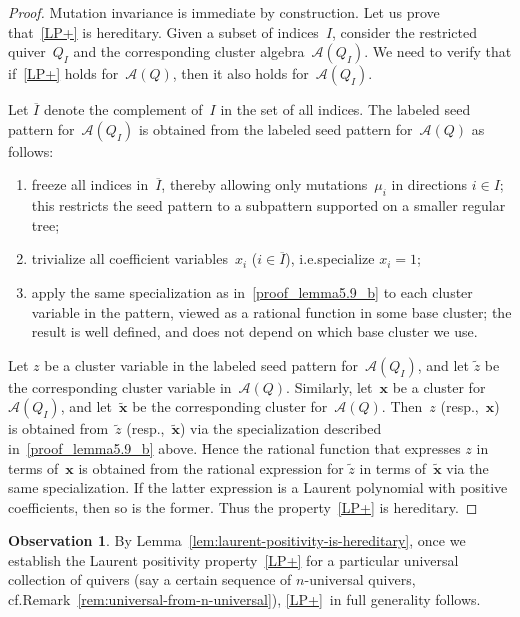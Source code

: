 \documentclass[10pt]{amsart}
\theoremstyle{definition}
\newtheorem{observation}[theorem]{Observation}
\newcommand{\cf}{cf.}
\newcommand{\ie}{i.e.}
\begin{document}
\begin{proof}
Mutation invariance is immediate by construction. Let us prove that~\ref{LP+} is hereditary. Given a subset of indices~$I$, consider the restricted quiver~$Q_I$ and the corresponding cluster algebra~$\mathcal{A}(Q_I)$. We need to verify that if~\ref{LP+} holds for~$\mathcal{A}(Q)$, then it also holds for~$\mathcal{A}(Q_I)$. 

Let $\overline I$ denote the complement of~$I$ in the set of all indices. The labeled seed pattern for~$\mathcal{A}(Q_I)$ is obtained from the labeled seed pattern for~$\mathcal{A}(Q)$ as follows: 
\begin{enumerate}[label=(\alph*)]
\item\label{proof_lemma5.9_a} %
freeze all indices in~$\overline I$, thereby allowing only mutations~$\mu_i$ in directions $i\in I$; this restricts the seed pattern to a subpattern supported on a smaller regular tree; 
\item\label{proof_lemma5.9_b} %
trivialize all coefficient variables~$x_i$ ($i\in\overline I$), \ie specialize $x_i=1$;
\item\label{proof_lemma5.9_c} %
apply the same specialization as in~\ref{proof_lemma5.9_b} to each cluster variable in the pattern, viewed as a rational function in some base cluster; the result is well defined, and does not depend on which base cluster we use. 
\end{enumerate}
Let $z$ be a cluster variable in the labeled seed pattern for~$\mathcal{A}(Q_I)$, and let $\tilde z$ be the corresponding cluster variable in~$\mathcal{A}(Q)$. Similarly, let~$\mathbf{x}$ be a cluster for~$\mathcal{A}(Q_I)$, and let~$\mathbf{\tilde x}$ be the corresponding cluster for~$\mathcal{A}(Q)$. 
Then~$z$ (resp.,~$\mathbf{x}$) is obtained from~$\tilde z$ (resp.,~$\mathbf{\tilde x}$) via the specialization described in~\ref{proof_lemma5.9_b} above. 
Hence the rational function that expresses $z$ in terms of~$\mathbf{x}$ is obtained from the rational expression for $\tilde z$ in terms of~$\mathbf{\tilde x}$ via the same specialization. If the latter expression is a Laurent polynomial with positive coefficients, then so is the former. Thus the property~\ref{LP+} is hereditary. 
\end{proof}

\begin{observation}
{%
By Lemma~\ref{lem:laurent-positivity-is-hereditary}, once we establish the Laurent positivity property~\ref{LP+} for a particular universal collection of quivers (say a certain sequence of $n$-universal quivers, \cf Remark~\ref{rem:universal-from-n-universal}), \ref{LP+}~in full generality follows. 
}
\end{observation}
\end{document}
